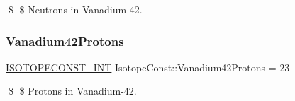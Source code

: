 \$ \$ Neutrons in Vanadium-\/42. \mbox{\label{group___isotope_const-_vanadium-_v42_ga5efd5885d8545f580df050b13ad47110}} 
\subsubsection{\texorpdfstring{Vanadium42\+Protons}{Vanadium42Protons}}
{\footnotesize\ttfamily \mbox{\hyperlink{group___isotope_const-_macros_ga5f18360b3e99483a35c32d789e62621c}{I\+S\+O\+T\+O\+P\+E\+C\+O\+N\+S\+T\+\_\+\+I\+NT}} Isotope\+Const\+::\+Vanadium42\+Protons = 23}

\$ \$ Protons in Vanadium-\/42. 